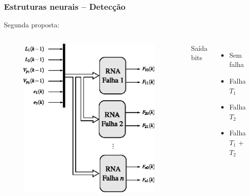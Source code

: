 \documentclass{beamer}
\begin{document}
\begin{frame}
    \frametitle{Estruturas neurais -- Detecção}

    Segunda proposta:

\begin{columns}
\begin{figure}[htb]
\centering
    \includegraphics[width=0.95\textwidth]{imgs/sistema/eps/detec_prop_2}
\end{figure}

    Saída  bits 
\begin{itemize}
    \item Sem falha
    \item Falha $T_1$
    \item Falha $T_2$
    \item Falha $T_1$ + $T_2$
\end{itemize}
\end{columns}
\end{frame}
\end{document}
